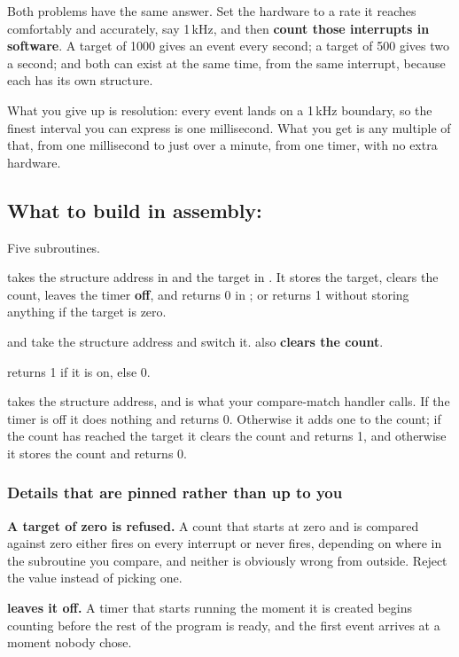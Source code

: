 Both problems have the same answer. Set the hardware to a rate it reaches comfortably and
accurately, say 1\,kHz, and then \textbf{count those interrupts in software}. A target of 1000
gives an event every second; a target of 500 gives two a second; and both can exist at the same
time, from the same interrupt, because each has its own structure.

What you give up is resolution: every event lands on a 1\,kHz boundary, so the finest interval you
can express is one millisecond. What you get is any multiple of that, from one millisecond to just
over a minute, from one timer, with no extra hardware.

\subsection{What to build in assembly: }
\label{c5:sec:driver}
Five subroutines.

\textbf{} takes the structure address in  and the target in
. It stores the target, clears the count, leaves the timer \textbf{off}, and returns 0
in ; or returns 1 without storing anything if the target is zero.

\textbf{} and \textbf{} take the structure address and switch it.
 also \textbf{clears the count}.

\textbf{} returns 1 if it is on, else 0.

\textbf{} takes the structure address, and is what your compare-match handler
calls. If the timer is off it does nothing and returns 0. Otherwise it adds one to the count; if the
count has reached the target it clears the count and returns 1, and otherwise it stores the count
and returns 0.

\subsubsection{Details that are pinned rather than up to you}
\textbf{A target of zero is refused.} A count that starts at zero and is compared against zero
either fires on every interrupt or never fires, depending on where in the subroutine you compare,
and neither is obviously wrong from outside. Reject the value instead of picking one.

\textbf{ leaves it off.} A timer that starts running the moment it is created
begins counting before the rest of the program is ready, and the first event arrives at a moment
nobody chose.

